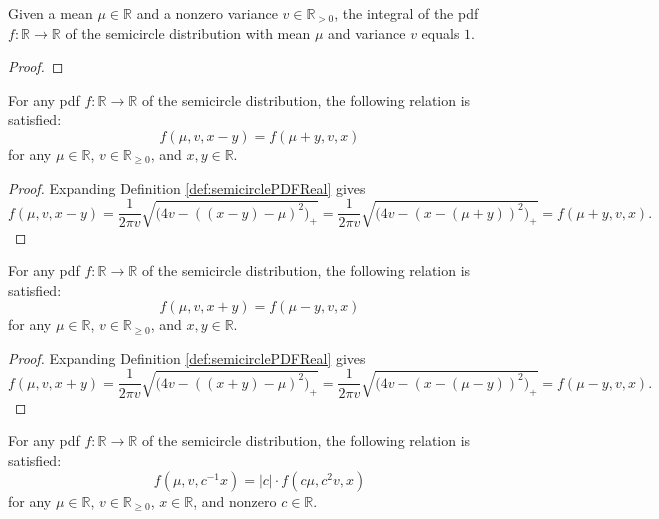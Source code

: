 \begin{lemma}\label{lem:integral_semicirclePDFReal_eq_one}
    \notready
    Given a mean $\mu \in \mathbb{R}$ and a nonzero variance $v \in \mathbb{R}_{> 0}$, the integral of the pdf $f : \mathbb{R} \rightarrow \mathbb{R}$ 
    of the semicircle distribution with mean $\mu$ and variance $v$ equals $1$.
\end{lemma}
\begin{proof}
\end{proof}
\begin{lemma}\label{lem:semicirclePDFReal_sub}
    \mathlibok
    For any pdf $f : \mathbb{R} \rightarrow \mathbb{R}$ 
    of the semicircle distribution, the following relation is satisfied:
    \[
    f(\mu,v,x-y) = f(\mu+y,v,x)
    \]
    for any $\mu \in \mathbb{R}$, $v \in \mathbb{R}_{\geq 0}$, and $x,y \in \mathbb{R}$. 
\end{lemma}
\begin{proof}
   Expanding Definition \ref{def:semicirclePDFReal} gives
   \[
   f(\mu,v,x-y) 
   = \frac{1}{2πv} \sqrt{\bigl( 4v - ( (x - y) - μ)^2 \bigl)_+} 
   = \frac{1}{2πv} \sqrt{\bigl( 4v - (x - (μ + y))^2 \bigl)_+}
   = f(\mu+y,v,x).
   \]
\end{proof}
\begin{lemma}\label{lem:semicirclePDFReal_add}
    \mathlibok
    For any pdf $f : \mathbb{R} \rightarrow \mathbb{R}$ 
    of the semicircle distribution, the following relation is satisfied:
    \[
    f(\mu,v,x+y) = f(\mu-y,v,x)
    \]
    for any $\mu \in \mathbb{R}$, $v \in \mathbb{R}_{\geq 0}$, and $x,y \in \mathbb{R}$. 
\end{lemma}
\begin{proof}
   Expanding Definition \ref{def:semicirclePDFReal} gives
   \[
   f(\mu,v,x+y) 
   = \frac{1}{2πv} \sqrt{\bigl( 4v - ( (x + y) - μ)^2 \bigl)_+} 
   = \frac{1}{2πv} \sqrt{\bigl( 4v - (x - (μ - y))^2 \bigl)_+}
   = f(\mu-y,v,x).
   \]
\end{proof}
\begin{lemma}\label{lem:semicirclePDFReal_inv_mul}
    \notready
    For any pdf $f : \mathbb{R} \rightarrow \mathbb{R}$ 
    of the semicircle distribution, the following relation is satisfied:
    \[
    f(\mu,v,c^{-1} x) = |c| \cdot f(c \mu,c^2 v,x)
    \]
    for any $\mu \in \mathbb{R}$, $v \in \mathbb{R}_{\geq 0}$, $x \in \mathbb{R}$, and nonzero $c \in \mathbb{R}$. 
\end{lemma}
